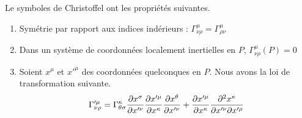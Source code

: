 \documentclass[a4paper,11pt]{report}
\begin{document}
            \begin{prop}\begin{leftbar}\label{prop:propgamma}
                Le symboles de Christoffel ont les propriétés suivantes.
                \begin{enumerate}[label = \textit{\roman*)}]
                    \item Symétrie par rapport aux indices indérieurs : $\Gamma^\mu_{\nu\rho}=\Gamma^\mu_{\rho\nu}$
                    \item Dans un système de coordonnées localement inertielles en $P$, $\Gamma^\mu_{\nu\rho}(P) = 0$
                    \item Soient $x^\mu$ et $x'^\mu$ des coordonnées quelconques en $P$. Nous avons la loi de transformation suivante.
                    \begin{equation}
                        \Gamma'^\mu_{\nu\rho} = \Gamma^\kappa_{\theta\sigma}\frac{\partial x^\sigma}{\partial x'^\nu} \frac{\partial x'^\mu}{\partial x^\kappa}\frac{\partial x^\theta}{\partial x'^\nu} +  \frac{\partial x'^\mu}{\partial x^\kappa}\frac{\partial^2 x^\kappa}{\partial x'^\nu\partial x'^\rho}
                    \end{equation}
                \end{enumerate}
            \end{leftbar}\end{prop}
            
\end{document}
